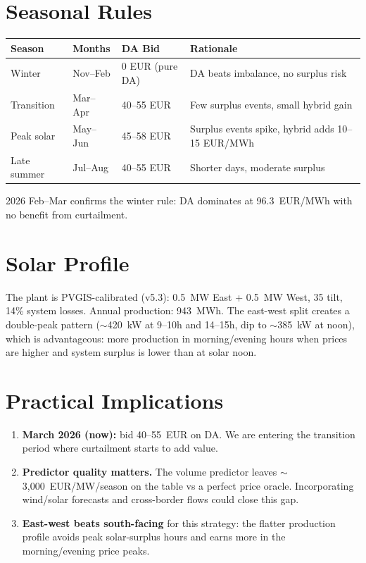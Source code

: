 \documentclass[11pt,a4paper]{article}
\begin{document}
\section*{Seasonal Rules}

\begin{table}[H]
\centering
\begin{tabular}{llll}
\toprule
\textbf{Season} & \textbf{Months} & \textbf{DA Bid} & \textbf{Rationale} \\
\midrule
Winter & Nov--Feb & 0 EUR (pure DA) & DA beats imbalance, no surplus risk \\
Transition & Mar--Apr & 40--55 EUR & Few surplus events, small hybrid gain \\
Peak solar & May--Jun & 45--58 EUR & Surplus events spike, hybrid adds 10--15 EUR/MWh \\
Late summer & Jul--Aug & 40--55 EUR & Shorter days, moderate surplus \\
\bottomrule
\end{tabular}
\end{table}

2026 Feb--Mar confirms the winter rule: DA dominates at 96.3~EUR/MWh with no benefit from curtailment.

\section*{Solar Profile}

The plant is PVGIS-calibrated (v5.3): 0.5~MW East + 0.5~MW West, 35\textdegree{} tilt, 14\% system losses. Annual production: 943~MWh. The east-west split creates a double-peak pattern ($\sim$420~kW at 9--10h and 14--15h, dip to $\sim$385~kW at noon), which is advantageous: more production in morning/evening hours when prices are higher and system surplus is lower than at solar noon.

\section*{Practical Implications}

\begin{enumerate}[leftmargin=*, itemsep=0.1em]
    \item \textbf{March 2026 (now):} bid 40--55~EUR on DA. We are entering the transition period where curtailment starts to add value.
    \item \textbf{Predictor quality matters.} The volume predictor leaves $\sim$3,000~EUR/MW/season on the table vs a perfect price oracle. Incorporating wind/solar forecasts and cross-border flows could close this gap.
    \item \textbf{East-west beats south-facing} for this strategy: the flatter production profile avoids peak solar-surplus hours and earns more in the morning/evening price peaks.
\end{enumerate}
\end{document}
